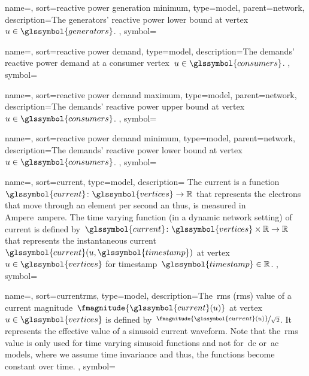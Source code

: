 {
    name={\reactivepowergenerationmin},
    sort={reactive power generation minimum},
    type={model},
    parent={network},
    description={The generators' reactive power lower bound at vertex~$\vertexa
    \in \glssymbol{generators}$.
    },
    symbol={\reactivepowergenerationmin}
}

{
    name={\reactivepowerdemand},
    sort={reactive power demand},
    type={model},
    description={The demands' reactive power demand at a consumer
    vertex~$\vertexa \in \glssymbol{consumers}$.
    },
    symbol={\reactivepowerdemand}
}

{
    name={\reactivepowerdemandmax},
    sort={reactive power demand maximum},
    type={model},
    parent={network},
    description={The demands' reactive power upper bound at vertex~$\vertexa \in
    \glssymbol{consumers}$.
    },
    symbol={\reactivepowerdemandmax}
}

{
    name={\reactivepowerdemandmin},
    sort={reactive power demand minimum},
    type={model},
    parent={network},
    description={The demands' reactive power lower bound at vertex~$\vertexa \in
    \glssymbol{consumers}$.
    },
    symbol={\reactivepowerdemandmin}
}

{
    name={\current},
    sort={current},
    type={model},
    description={ The current is a
    function~$\glssymbol{current}\colon\glssymbol{vertices}\to\reals$ that
    represents the electrons that move through an element per second an thus, is
    measured in Ampere~\gls{ampere}. The time varying function (in a dynamic
    network setting) of current is defined
    by~$\glssymbol{current}\colon\glssymbol{vertices}\times\reals\to\reals$ that
    represents the instantaneous
    current~$\glssymbol{current}(\vertexa,\glssymbol{timestamp})$ at
    vertex~$\vertexa\in\glssymbol{vertices}$ for
    timestamp~$\glssymbol{timestamp}\in\reals$.
    },
    symbol={\current}
}

{
    name={\currentrms},
    sort={currentrms},
    type={model},
    description={The~\acrlong{rms} (\gls{rms}) value of a current
    magnitude~$\fmagnitude{\glssymbol{current}(\vertexa)}$ at
    vertex~$\vertexa\in\glssymbol{vertices}$ is defined
    by~$\nicefrac{\fmagnitude{\glssymbol{current}(\vertexa)}}{
    \sqrt{2}}$. It
    represents the effective value of a sinusoid current waveform. Note that
    the~\gls{rms} value is only used for time varying sinusoid functions and not
    for~\gls{dc} or~\gls{ac} models, where we assume time invariance and thus,
    the functions become constant over time.
    },
    symbol={\currentrms}
}


